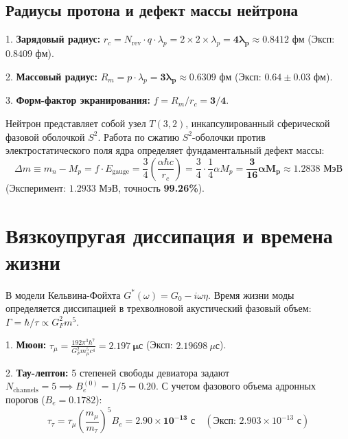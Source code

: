 \documentclass[12pt,a4paper]{article}
\begin{document}
	\subsection{Радиусы протона и дефект массы нейтрона}
	1. \textbf{Зарядовый радиус:} $r_c = N_{\text{rev}} \cdot q \cdot \lambda_p = 2 \times 2 \times \lambda_p = \mathbf{4 \lambda_p \approx 0.8412 \text{ фм}}$ (Эксп: $0.8409$ фм).
	
	2. \textbf{Массовый радиус:} $R_m = p \cdot \lambda_p = \mathbf{3 \lambda_p \approx 0.6309 \text{ фм}}$ (Эксп: $0.64 \pm 0.03$ фм).
	
	3. \textbf{Форм-фактор экранирования:} $f = R_m / r_c = \mathbf{3/4}$.
	
	Нейтрон представляет собой узел $T(3,2)$, инкапсулированный сферической фазовой оболочкой $S^2$. Работа по сжатию $S^2$-оболочки против электростатического поля ядра определяет фундаментальный дефект массы:
	\begin{equation}
		\Delta m \equiv m_n - M_p = f \cdot E_{\text{gauge}} = \frac{3}{4} \left( \frac{\alpha \hbar c}{r_c} \right) = \frac{3}{4} \cdot \frac{1}{4} \alpha M_p = \mathbf{\frac{3}{16} \alpha M_p} \approx \mathbf{1.2838 \text{ МэВ}}
	\end{equation}
	(Эксперимент: $1.2933$ МэВ, точность \textbf{99.26\%}).
	
	\section{Вязкоупругая диссипация и времена жизни}
	
	В модели Кельвина-Фойхта $G^*(\omega) = G_0 - i\omega\eta$. Время жизни моды определяется диссипацией в трехволновой акустический фазовый объем: $\Gamma = \hbar/\tau \propto G_F^2 m^5$.
	
	1. \textbf{Мюон:} $\tau_\mu = \frac{192\pi^3\hbar^7}{G_F^2 m_\mu^5 c^4} = \mathbf{2.197 \ \mu\text{с}}$ (Эксп: $2.19698 \ \mu\text{с}$).
	
	2. \textbf{Тау-лептон:} 5 степеней свободы девиатора задают $N_{\text{channels}} = 5 \implies B_e^{(0)} = 1/5 = 0.20$. С учетом фазового объема адронных порогов ($B_e = 0.1782$):
	\begin{equation}
		\tau_\tau = \tau_\mu \left( \frac{m_\mu}{m_\tau} \right)^5 B_e = \mathbf{2.90 \times 10^{-13} \text{ с}} \quad (\text{Эксп: } 2.903 \times 10^{-13} \text{ с})
	\end{equation}
	
\end{document}
